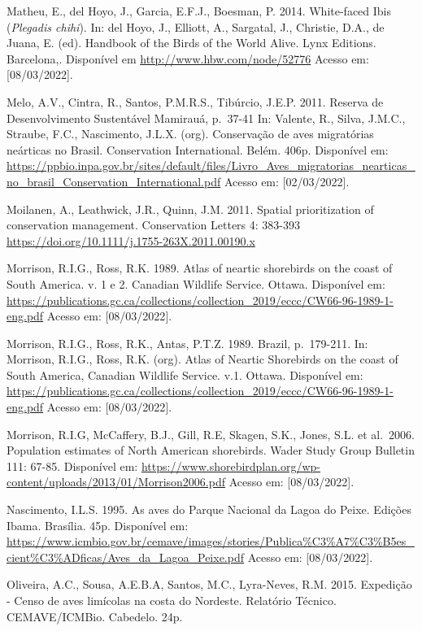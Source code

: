 \documentclass[
  oneside]{scrbook}
\begin{document}
Matheu, E., del Hoyo, J., Garcia, E.F.J., Boesman, P. 2014. White-faced Ibis (\emph{Plegadis chihi}). In: del Hoyo, J., Elliott, A., Sargatal, J., Christie, D.A., de Juana, E. (ed). Handbook of the Birds of the World Alive. Lynx Editions. Barcelona,. Disponível em \url{http://www.hbw.com/node/52776} Acesso em: {[}08/03/2022{]}.

Melo, A.V., Cintra, R., Santos, P.M.R.S., Tibúrcio, J.E.P. 2011. Reserva de Desenvolvimento Sustentável Mamirauá, p.~37-41 In: Valente, R., Silva, J.M.C., Straube, F.C., Nascimento, J.L.X. (org). Conservação de aves migratórias neárticas no Brasil. Conservation International. Belém. 406p. Disponível em: \url{https://ppbio.inpa.gov.br/sites/default/files/Livro_Aves_migratorias_nearticas_no_brasil_Conservation_International.pdf} Acesso em: {[}02/03/2022{]}.

Moilanen, A., Leathwick, J.R., Quinn, J.M. 2011. Spatial prioritization of conservation management. Conservation Letters 4: 383-393 \url{https://doi.org/10.1111/j.1755-263X.2011.00190.x}

Morrison, R.I.G., Ross, R.K. 1989. Atlas of neartic shorebirds on the coast of South America. v. 1 e 2. Canadian Wildlife Service. Ottawa. Disponível em: \url{https://publications.gc.ca/collections/collection_2019/eccc/CW66-96-1989-1-eng.pdf} Acesso em: {[}08/03/2022{]}.

Morrison, R.I.G., Ross, R.K., Antas, P.T.Z. 1989. Brazil, p.~179-211. In: Morrison, R.I.G., Ross, R.K. (org). Atlas of Neartic Shorebirds on the coast of South America, Canadian Wildlife Service. v.1. Ottawa. Disponível em: \url{https://publications.gc.ca/collections/collection_2019/eccc/CW66-96-1989-1-eng.pdf} Acesso em: {[}08/03/2022{]}.

Morrison, R.I.G, McCaffery, B.J., Gill, R.E, Skagen, S.K., Jones, S.L. et al.~2006. Population estimates of North American shorebirds. Wader Study Group Bulletin 111: 67-85. Disponível em: \url{https://www.shorebirdplan.org/wp-content/uploads/2013/01/Morrison2006.pdf} Acesso em: {[}08/03/2022{]}.

Nascimento, I.L.S. 1995. As aves do Parque Nacional da Lagoa do Peixe. Edições Ibama. Brasília. 45p. Disponível em: \url{https://www.icmbio.gov.br/cemave/images/stories/Publica\%C3\%A7\%C3\%B5es_cient\%C3\%ADficas/Aves_da_Lagoa_Peixe.pdf} Acesso em: {[}08/03/2022{]}.

Oliveira, A.C., Sousa, A.E.B.A, Santos, M.C., Lyra-Neves, R.M. 2015. Expedição - Censo de aves limícolas na costa do Nordeste. Relatório Técnico. CEMAVE/ICMBio. Cabedelo. 24p.
\end{document}
